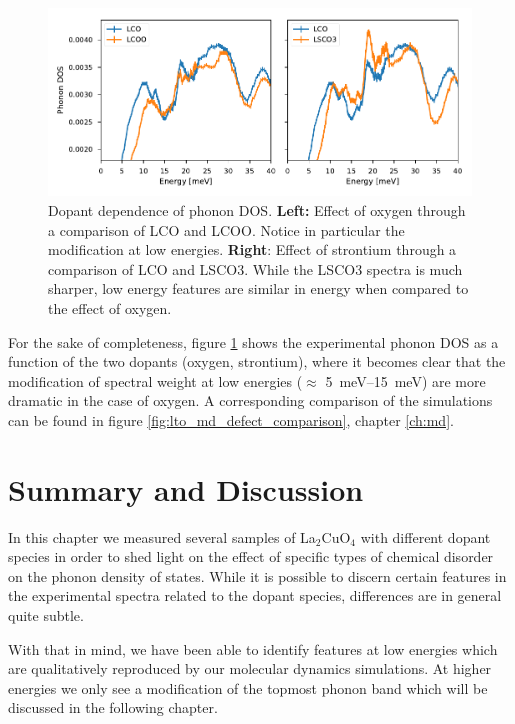 \begin{figure}
    \centering
    \includegraphics[width=\textwidth]{fig/gdos/in4_low_energy_compare.pdf}
    \caption{Dopant dependence of phonon DOS. \textbf{Left:} Effect of oxygen through a comparison of LCO and LCOO. Notice in particular the modification at low energies. \textbf{Right}: Effect of strontium through a comparison of LCO and LSCO3. While the LSCO3 spectra is much sharper, low energy features are similar in energy when compared to the effect of oxygen.}
    \label{fig:in4_low_energy_compare}
\end{figure}

For the sake of completeness, figure \ref{fig:in4_low_energy_compare} shows the experimental phonon DOS as a function of the two dopants (oxygen, strontium), where it becomes clear that the modification of spectral weight at low energies ($\approx$ \SIrange{5}{15}{\milli\eV}) are more dramatic in the case of oxygen. A corresponding comparison of the simulations can be found in figure \ref{fig:lto_md_defect_comparison}, chapter \ref{ch:md}.

\section{Summary and Discussion}
In this chapter we measured several samples of La$_2$CuO$_4$ with different dopant species in order to shed light on the effect of specific types of chemical disorder on the phonon density of states. While it is possible to discern certain features in the experimental spectra related to the dopant species, differences are in general quite subtle.

With that in mind, we have been able to identify features at low energies which are qualitatively reproduced by our molecular dynamics simulations. At higher energies we only see a modification of the topmost phonon band which will be discussed in the following chapter.

